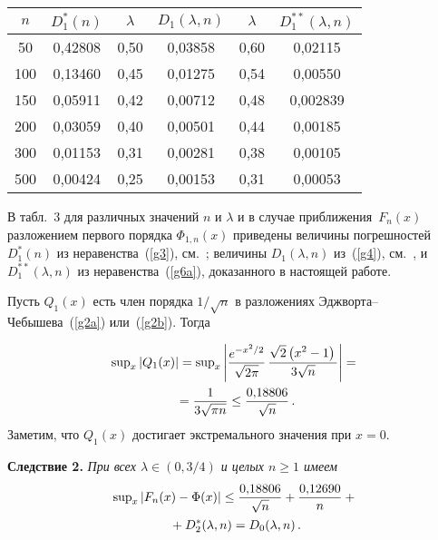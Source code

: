 \begin{multicols}{2}
\begin{center}
\vspace*{2ex}
{\small
\begin{tabular}{|c|c||c|c||c|c|}
\hline
$n$ & $D^*_1(n)$ & $\lambda$ &   $D_1(\lambda,n)$ & $\lambda$ &   $D_1^{**}(\lambda,n)$\\
\hline
\hphantom{9}50   & 0,42808 & 0,50 & 0,03858 & 0,60 & 0,02115\\
100   & 0,13460 & 0,45 & 0,01275 & 0,54 & 0,00550\\
150  & 0,05911 & 0,42 & 0,00712 & 0,48 & \hphantom{9}0,002839\\
200  & 0,03059 & 0,40 & 0,00501 & 0,44 & 0,00185\\
300& 0,01153 & 0,31 & 0,00281 & 0,38 & 0,00105\\
500 & 0,00424 & 0,25 & 0,00153 & 0,31 & 0,00053\\
\hline 
\end{tabular}
}
\end{center}

\smallskip
\addtocounter{table}{1}


В табл.~3 для различных значений $n$ и $\lambda$ и в случае приближения~$F_n(x)$  
разложением первого порядка $\Phi_{1,n}(x)$ приведены  величины погрешностей   $D^*_1(n)$ 
из неравенства~(\ref{g3}), см.~\cite{6-cr}; величины   $D_1(\lambda,n)$ из~(\ref{g4}), см.~\cite{1-cr}, 
и $D_1^{**}(\lambda,n)$ из неравенства~(\ref{g6a}), доказанного в настоящей работе.



Пусть $Q_1(x)$ есть член порядка   $1/\sqrt{n}$ в разложениях Эджворта--Чебышева~(\ref{g2a})  
или~(\ref{g2b}). Тогда

\noindent
\begin{multline*} 
\sup\nolimits_x|Q_1(x)|=\sup\nolimits_x \left|\displaystyle\frac{\displaystyle e^{-x^2/2}\mathstrut}{\displaystyle \sqrt{2\pi}\mathstrut}\,
  \displaystyle\frac{\displaystyle \sqrt{2}\left(x^2-1\right)\mathstrut}{\displaystyle 3 \sqrt{n}\mathstrut}\right|={}\\
  {}= \displaystyle\frac{\displaystyle 1\mathstrut}{\displaystyle 3\sqrt{\pi n}\mathstrut}\leq \displaystyle\frac{\displaystyle 0{,}18806\mathstrut}{\displaystyle \sqrt{n}\mathstrut}\,.
  \end{multline*}
Заметим, что $Q_1(x)$ достигает экстремального значения при   $x=0$.

\medskip

\noindent
\textbf{Следствие 2.} \textit{При всех $\lambda \in (0,3/4)$  и целых $n\geq 1$ имеем}
\begin{multline}
\sup\nolimits_x \left\vert F_n(x) - \Phi(x)\right\vert \leq  \displaystyle\frac{\displaystyle 0{,}18806\mathstrut}{\displaystyle \sqrt{n}\mathstrut}+
\displaystyle\frac{\displaystyle 0{,}12690\mathstrut}{\displaystyle n\mathstrut} +{}\\
{}+D_2^*(\lambda,n)= D_0(\lambda,n)\,.
\label{g6b}
\end{multline}


\end{multicols}
